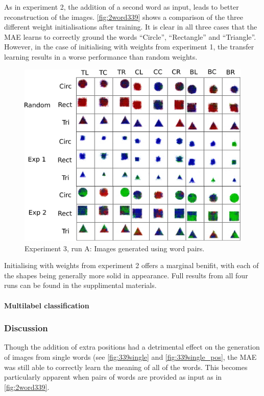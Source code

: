 As in experiment 2, the addition of a second word as input, leads to better reconstruction of the images. \autoref{fig:2word339} shows a comparison of the three different weight initialisations after training. It is clear in all three cases that the MAE learns to correctly ground the words ``Circle'', ``Rectangle'' and ``Triangle''. However, in the case of initialising with weights from experiment 1, the transfer learning results in a worse performance than random weights.
\begin{figure}[h]
\centering
\includegraphics[width=\textwidth]{Figs/shapes/2word339_pos.png}
\caption{Experiment 3, run A: Images generated using word pairs.}
\label{fig:2word339}
\end{figure}

Initialising with weights from experiment 2 offers a marginal benifit, with each of the shapes being generally more solid in appearance. Full results from all four runs can be found in the supplimental materials.


\paragraph{Multilabel classification}

\subsubsection{Discussion}
Though the addition of extra positions had a detrimental effect on the generation of images from single words (see \autoref{fig:339single} and \autoref{fig:339single_pos}, the MAE was still able to correctly learn the meaning of all of the words. This becomes particularly apparent when pairs of words are provided as input as in \autoref{fig:2word339}.

